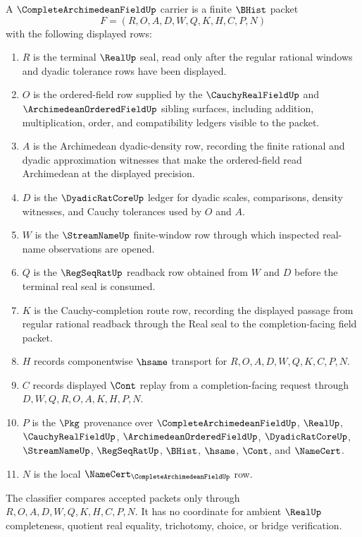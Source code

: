 \begin{definition}
\label{def:complete-archimedean-field-carrier}
A $\CompleteArchimedeanFieldUp$ carrier is a finite $\BHist$ packet
$$
F=(R,O,A,D,W,Q,K,H,C,P,N)
$$
with the following displayed rows:
\begin{enumerate}
\item $R$ is the terminal $\RealUp$ seal, read only after the regular rational windows and dyadic tolerance rows have been displayed.
\item $O$ is the ordered-field row supplied by the $\CauchyRealFieldUp$ and $\ArchimedeanOrderedFieldUp$ sibling surfaces, including addition, multiplication, order, and compatibility ledgers visible to the packet.
\item $A$ is the Archimedean dyadic-density row, recording the finite rational and dyadic approximation witnesses that make the ordered-field read Archimedean at the displayed precision.
\item $D$ is the $\DyadicRatCoreUp$ ledger for dyadic scales, comparisons, density witnesses, and Cauchy tolerances used by $O$ and $A$.
\item $W$ is the $\StreamNameUp$ finite-window row through which inspected real-name observations are opened.
\item $Q$ is the $\RegSeqRatUp$ readback row obtained from $W$ and $D$ before the terminal real seal is consumed.
\item $K$ is the Cauchy-completion route row, recording the displayed passage from regular rational readback through the Real seal to the completion-facing field packet.
\item $H$ records componentwise $\hsame$ transport for $R,O,A,D,W,Q,K,C,P,N$.
\item $C$ records displayed $\Cont$ replay from a completion-facing request through $D,W,Q,R,O,A,K,H,P,N$.
\item $P$ is the $\Pkg$ provenance over $\CompleteArchimedeanFieldUp$, $\RealUp$, $\CauchyRealFieldUp$, $\ArchimedeanOrderedFieldUp$, $\DyadicRatCoreUp$, $\StreamNameUp$, $\RegSeqRatUp$, $\BHist$, $\hsame$, $\Cont$, and $\NameCert$.
\item $N$ is the local $\NameCert_{\CompleteArchimedeanFieldUp}$ row.
\end{enumerate}
The classifier compares accepted packets only through $R,O,A,D,W,Q,K,H,C,P,N$. It has no coordinate for ambient $\RealUp$ completeness, quotient real equality, trichotomy, choice, or bridge verification.
\end{definition}

